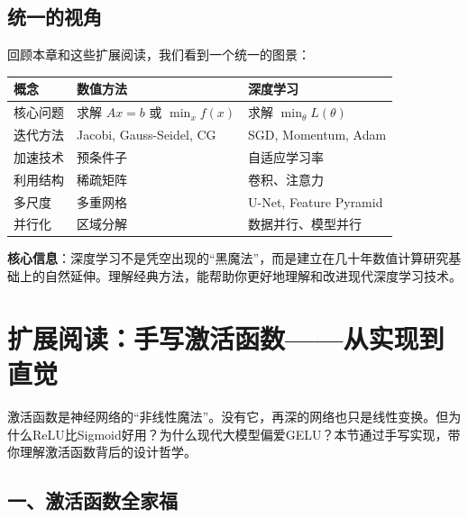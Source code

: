 \subsection*{统一的视角}

回顾本章和这些扩展阅读，我们看到一个统一的图景：

\begin{center}
\renewcommand{\arraystretch}{1.5}
\begin{tabular}{l|l|l}
\toprule
\textbf{概念} & \textbf{数值方法} & \textbf{深度学习} \\
\midrule
核心问题 & 求解 $Ax = b$ 或 $\min_x f(x)$ & 求解 $\min_\theta L(\theta)$ \\
迭代方法 & Jacobi, Gauss-Seidel, CG & SGD, Momentum, Adam \\
加速技术 & 预条件子 & 自适应学习率 \\
利用结构 & 稀疏矩阵 & 卷积、注意力 \\
多尺度 & 多重网格 & U-Net, Feature Pyramid \\
并行化 & 区域分解 & 数据并行、模型并行 \\
\bottomrule
\end{tabular}
\end{center}

\textbf{核心信息}：深度学习不是凭空出现的``黑魔法''，而是建立在几十年数值计算研究基础上的自然延伸。理解经典方法，能帮助你更好地理解和改进现代深度学习技术。


\section*{扩展阅读：手写激活函数——从实现到直觉}

\begin{tcolorbox}[colback=gray!5, colframe=gray!50, title=本节导读]
激活函数是神经网络的“非线性魔法”。没有它，再深的网络也只是线性变换。但为什么ReLU比Sigmoid好用？为什么现代大模型偏爱GELU？本节通过手写实现，带你理解激活函数背后的设计哲学。
\end{tcolorbox}

\subsection*{一、激活函数全家福}

